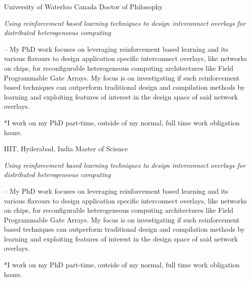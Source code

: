 	{%
		University of Waterloo Canada}
	{%
		Doctor of Philosophy
	}	
	{
	\vspace{1ex}
	\textit{Using reinforcement based learning techniques to design interconnect overlays for distributed heterogeneous computing}
	\vspace{2ex}
	
	-- My PhD work focuses on leveraging reinforcement based learning and its various flavours to design application specific interconnect overlays, like networks on chips, for reconfigurable heterogeneous computing architectures like Field Programmable Gate Arrays. My focus is on investigating if such reinforcement based techniques can outperform traditional design and compilation methods by learning and exploiting features of interest in the design space of said network overlays.
	
	\vspace{2ex}
	
	*I work on my PhD part-time, outside of my normal, full time work obligation hours.
	}

	{%
		IIIT, Hyderabad, India}
	{%
		Master of Science
	}	
	{
	\vspace{1ex}
	\textit{Using reinforcement based learning techniques to design interconnect overlays for distributed heterogeneous computing}
	\vspace{2ex}
	
	-- My PhD work focuses on leveraging reinforcement based learning and its various flavours to design application specific interconnect overlays, like networks on chips, for reconfigurable heterogeneous computing architectures like Field Programmable Gate Arrays. My focus is on investigating if such reinforcement based techniques can outperform traditional design and compilation methods by learning and exploiting features of interest in the design space of said network overlays.
	
	\vspace{2ex}
	
	*I work on my PhD part-time, outside of my normal, full time work obligation hours.
	}
